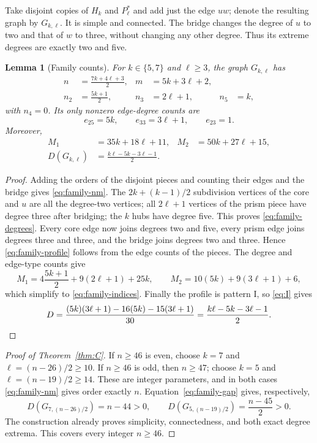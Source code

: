 \documentclass[11pt]{amsart}
\newtheorem{lemma}[theorem]{Lemma}
\theoremstyle{definition}
\theoremstyle{remark}
\begin{document}
Take disjoint copies of $H_k$ and $P_\ell^*$ and add just the edge $uw$; denote the resulting graph by $G_{k,\ell}$. It is simple and connected. The bridge changes the degree of $u$ to two and that of $w$ to three, without changing any other degree. Thus its extreme degrees are exactly two and five.

\begin{lemma}[Family counts]\label{lem:family}
For $k\in\{5,7\}$ and $\ell\ge3$, the graph $G_{k,\ell}$ has
\begin{align}
 n&=\frac{7k+4\ell+3}{2},& m&=5k+3\ell+2,\label{eq:family-nm}\\
 n_2&=\frac{5k+1}{2},&n_3&=2\ell+1,& n_5&=k,\label{eq:family-degrees}
\end{align}
with $n_4=0$. Its only nonzero edge-degree counts are
\begin{equation}\label{eq:family-profile}
 e_{25}=5k,\qquad e_{33}=3\ell+1,\qquad e_{23}=1.
\end{equation}
Moreover,
\begin{align}
 M_1&=35k+18\ell+11,& M_2&=50k+27\ell+15,\label{eq:family-indices}\\
 D(G_{k,\ell})&=\frac{k\ell-5k-3\ell-1}{2}.\label{eq:family-gap}
\end{align}
\end{lemma}
\begin{proof}
Adding the orders of the disjoint pieces and counting their edges and the bridge gives \eqref{eq:family-nm}. The $2k+(k-1)/2$ subdivision vertices of the core and $u$ are all the degree-two vertices; all $2\ell+1$ vertices of the prism piece have degree three after bridging; the $k$ hubs have degree five. This proves \eqref{eq:family-degrees}. Every core edge now joins degrees two and five, every prism edge joins degrees three and three, and the bridge joins degrees two and three. Hence \eqref{eq:family-profile} follows from the edge counts of the pieces. The degree and edge-type counts give
\[
 M_1=4\frac{5k+1}{2}+9(2\ell+1)+25k,
 \qquad M_2=10(5k)+9(3\ell+1)+6,
\]
which simplify to \eqref{eq:family-indices}. Finally the profile is pattern I, so \eqref{eq:I} gives
\[
 D=\frac{(5k)(3\ell+1)-16(5k)-15(3\ell+1)}{30}
  =\frac{k\ell-5k-3\ell-1}{2}.\qedhere
\]
\end{proof}

\begin{proof}[Proof of Theorem~\ref{thm:C}]
If $n\ge46$ is even, choose $k=7$ and $\ell=(n-26)/2\ge10$. If $n\ge46$ is odd, then $n\ge47$; choose $k=5$ and $\ell=(n-19)/2\ge14$. These are integer parameters, and in both cases \eqref{eq:family-nm} gives order exactly $n$. Equation~\eqref{eq:family-gap} gives, respectively,
\[
 D(G_{7,(n-26)/2})=n-44>0,
 \qquad D(G_{5,(n-19)/2})=\frac{n-45}{2}>0.
\]
The construction already proves simplicity, connectedness, and both exact degree extrema. This covers every integer $n\ge46$.
\end{proof}
\end{document}
